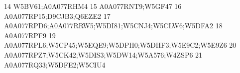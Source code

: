 \documentclass{beamer}
\begin{document}
\begin{frame}[fragile]
\begin{itemize}
\begin{Schunk}
\begin{Soutput}
14                                                                                                                                                                                                                                                                                                                                                              W5BV61;A0A077RHM4
15                                                                                                                                                                                                                                                                                                                                                              A0A077RNT9;W5GF47
16                                                                                                                                                                                                                                                                                                                                                       A0A077RP15;D9CJB3;Q6EZE2
17                                                                                                                                                                                                                                                                                                                              A0A077RPD6;A0A077RRW5;W5DI81;W5CNJ4;W5CLW6;W5DFA2
18                                                                                                                                                                                                                                                                                                                                                                     A0A077RPF9
19                                                                                                                                                                                                                                                                                                                           A0A077RPL6;W5CP45;W5EQE9;W5DPH0;W5DHF3;W5E9C2;W5E9Z6
20                                                                                                                                                                                                                                                                                                                                  A0A077RPZ7;W5CK42;W5DIS3;W5DW14;W5A576;W4ZSP6
21                                                                                                                                                                                                                                                                                                                                                       A0A077RQ33;W5DFE2;W5CIU4

\end{Soutput}
\end{Schunk}
\end{itemize}
\end{frame}
\end{document}
